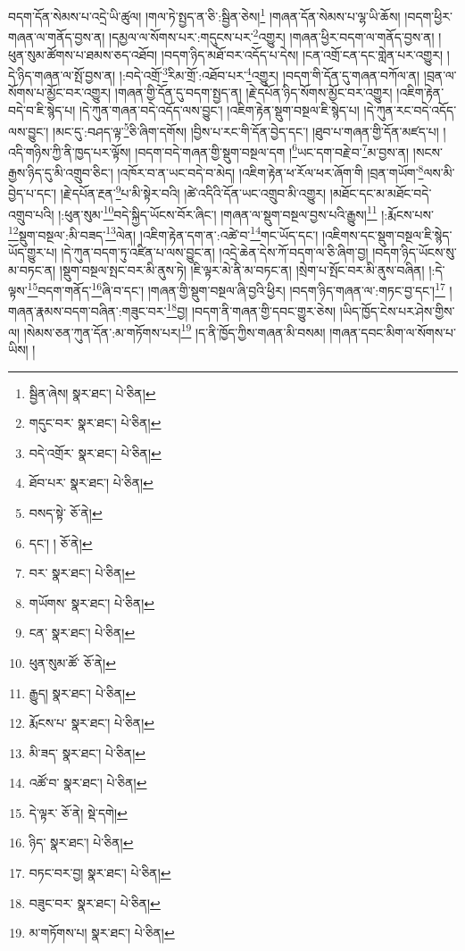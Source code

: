 བདག་དོན་སེམས་པ་འདྲེ་ཡི་ཚུལ། །གལ་ཏེ་སྤྱད་ན་ཅི་:སྦྱིན་ཅེས།\footnote{སྦྱིན་ཞེས།  སྣར་ཐང་།  པེ་ཅིན། } །གཞན་དོན་སེམས་པ་ལྷ་ཡི་ཆོས། །བདག་ཕྱིར་གཞན་ལ་གནོད་བྱས་ན། །དམྱལ་ལ་སོགས་པར་:གདུངས་པར་\footnote{གདུང་བར་  སྣར་ཐང་།  པེ་ཅིན། }འགྱུར། །གཞན་ཕྱིར་བདག་ལ་གནོད་བྱས་ན། །ཕུན་སུམ་ཚོགས་པ་ཐམས་ཅད་འཐོབ། །བདག་ཉིད་མཐོ་བར་འདོད་པ་དེས། །ངན་འགྲོ་ངན་དང་གླེན་པར་འགྱུར། །དེ་ཉིད་གཞན་ལ་སྤོ་བྱས་ན། །:བདེ་འགྲོ་\footnote{བདེ་འགྲོར་  སྣར་ཐང་།  པེ་ཅིན། }རིམ་གྲོ་:འཐོབ་པར་\footnote{ཐོབ་པར་  སྣར་ཐང་།  པེ་ཅིན། }འགྱུར། །བདག་གི་དོན་དུ་གཞན་བཀོལ་ན། །བྲན་ལ་སོགས་པ་མྱོང་བར་འགྱུར། །གཞན་གྱི་དོན་དུ་བདག་སྤྱད་ན། །རྗེ་དཔོན་ཉིད་སོགས་མྱོང་བར་འགྱུར། །འཇིག་རྟེན་བདེ་བ་ཇི་སྙེད་པ། །དེ་ཀུན་གཞན་བདེ་འདོད་ལས་བྱུང་། །འཇིག་རྟེན་སྡུག་བསྔལ་ཇི་སྙེད་པ། །དེ་ཀུན་རང་བདེ་འདོད་ལས་བྱུང་། །མང་དུ་:བཤད་ལྟ་\footnote{བསད་སྟེ་  ཅོ་ནེ། }ཅི་ཞིག་དགོས། །བྱིས་པ་རང་གི་དོན་བྱེད་དང་། །ཐུབ་པ་གཞན་གྱི་དོན་མཛད་པ། །འདི་གཉིས་ཀྱི་ནི་ཁྱད་པར་ལྟོས། །བདག་བདེ་གཞན་གྱི་སྡུག་བསྔལ་དག །\footnote{དང་། །  ཅོ་ནེ། }ཡང་དག་བརྗེ་བ་\footnote{བར་  སྣར་ཐང་།  པེ་ཅིན། }མ་བྱས་ན། །སངས་རྒྱས་ཉིད་དུ་མི་འགྲུབ་ཅིང་། །འཁོར་བ་ན་ཡང་བདེ་བ་མེད། །འཇིག་རྟེན་ཕ་རོལ་ཕར་ཞོག་གི །བྲན་གཡོག་\footnote{གཡོགས་  སྣར་ཐང་།  པེ་ཅིན། }ལས་མི་བྱེད་པ་དང་། །རྗེ་དཔོན་རྔན་\footnote{ངན་  སྣར་ཐང་།  པེ་ཅིན། }པ་མི་སྟེར་བའི། །ཚེ་འདིའི་དོན་ཡང་འགྲུབ་མི་འགྱུར། །མཐོང་དང་མ་མཐོང་བདེ་འགྲུབ་པའི། །:ཕུན་སུམ་\footnote{ཕུན་སུམ་ཚོ་  ཅོ་ནེ། }བདེ་སྐྱིད་ཡོངས་བོར་ཞིང་། །གཞན་ལ་སྡུག་བསྔལ་བྱས་པའི་རྒྱུས།\footnote{རྒྱུད།  སྣར་ཐང་།  པེ་ཅིན། } །:རྨོངས་པས་\footnote{རྨོངས་པ་  སྣར་ཐང་།  པེ་ཅིན། }སྡུག་བསྔལ་:མི་བཟད་\footnote{མི་ཟད་  སྣར་ཐང་།  པེ་ཅིན། }ལེན། །འཇིག་རྟེན་དག་ན་:འཚེ་བ་\footnote{འཚོ་བ་  སྣར་ཐང་།  པེ་ཅིན། }གང་ཡོད་དང་། །འཇིགས་དང་སྡུག་བསྔལ་ཇི་སྙེད་ཡོད་གྱུར་པ། །དེ་ཀུན་བདག་ཏུ་འཛིན་པ་ལས་བྱུང་ན། །འདྲེ་ཆེན་དེས་ཀོ་བདག་ལ་ཅི་ཞིག་བྱ། །བདག་ཉིད་ཡོངས་སུ་མ་བཏང་ན། །སྡུག་བསྔལ་སྤང་བར་མི་ནུས་ཏེ། །ཇི་ལྟར་མེ་ནི་མ་བཏང་ན། །སྲེག་པ་སྤོང་བར་མི་ནུས་བཞིན། །:དེ་ལྟས་\footnote{དེ་ལྟར་  ཅོ་ནེ།  སྡེ་དགེ། }བདག་གནོད་\footnote{ཉིད་  སྣར་ཐང་།  པེ་ཅིན། }ཞི་བ་དང་། །གཞན་གྱི་སྡུག་བསྔལ་ཞི་བྱའི་ཕྱིར། །བདག་ཉིད་གཞན་ལ་:གཏང་བྱ་དང་།\footnote{བཏང་བར་བྱ།  སྣར་ཐང་།  པེ་ཅིན། } །གཞན་རྣམས་བདག་བཞིན་:གཟུང་བར་\footnote{བཟུང་བར་  སྣར་ཐང་།  པེ་ཅིན། }བྱ། །བདག་ནི་གཞན་གྱི་དབང་གྱུར་ཅེས། །ཡིད་ཁྱོད་ངེས་པར་ཤེས་གྱིས་ལ། །སེམས་ཅན་ཀུན་དོན་:མ་གཏོགས་པར།\footnote{མ་གཏོགས་པ།  སྣར་ཐང་།  པེ་ཅིན། } །ད་ནི་ཁྱོད་ཀྱིས་གཞན་མི་བསམ། །གཞན་དབང་མིག་ལ་སོགས་པ་ཡིས། །
